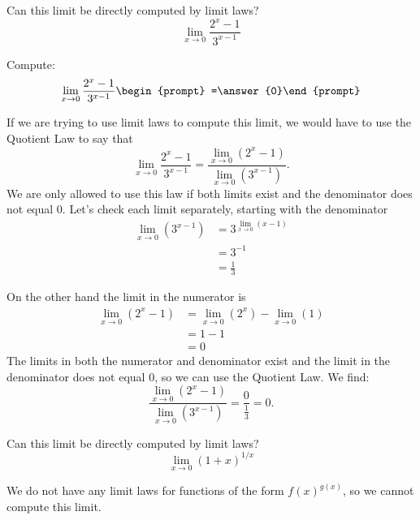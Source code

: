 \documentclass{ximera}
\begin{document}
\begin{question}
  Can this limit be directly computed by limit laws?
  \[
  \lim_{x\to0}\frac{2^x-1}{3^{x-1}}
  \]
  \begin{multipleChoice}
  \end{multipleChoice}
  \begin{question}
    Compute:
    \[
    \lim_{x\to0}\frac{2^x-1}{3^{x-1}}\begin{prompt} =\answer{0}\end{prompt}
    \]
    \begin{feedback}
      If we are trying to use limit laws to compute this limit, we
      would have to use the Quotient Law to say that
      \[
      \lim_{x\to 0}\frac{2^x-1}{3^{x-1}} = \frac{\lim_{x\to
          0}(2^x-1)}{\lim_{x\to 0}(3^{x-1})}.
      \]
      We are only allowed to use this law if both limits exist and the
      denominator does not equal $0$.  Let's check each limit
      separately, starting with the denominator
      \begin{align*}
        \lim_{x\to 0}(3^{x-1}) &=3^{\lim_{x\to0}(x-1)}\\
        &=3^{-1}\\
        &=\frac{1}{3}
      \end{align*}

      On the other hand the limit in the numerator is
      \begin{align*}
        \lim_{x\to 0}(2^x-1) &=\lim_{x\to0}(2^x)-\lim_{x\to0}(1)\\
        &=1-1\\
        &=0
      \end{align*}
      The limits in both the numerator and denominator exist and the
      limit in the denominator does not equal $0$, so we can use the
      Quotient Law.  We find:
      \[
        \frac{\lim_{x\to 0}(2^x-1)}{\lim_{x\to 0}(3^{x-1})}
        =\frac{0}{\frac{1}{3}}=0.
        \]
    \end{feedback}
  \end{question}
\end{question}


\begin{question}
  Can this limit be directly computed by limit laws?
  \[
  \lim_{x\to 0}(1+x)^{1/x}
  \]
  \begin{multipleChoice}
  \end{multipleChoice}
  \begin{feedback}
  We do not have any limit laws for functions of the form $f(x)^{g(x)}$, so we cannot compute this limit.
  \end{feedback}
\end{question}
\end{document}
